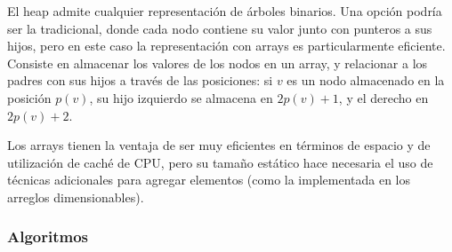 \documentclass{article}
\begin{document}
El heap admite cualquier representación de árboles binarios. Una opción podría ser la tradicional, donde cada nodo contiene su valor junto con punteros a sus hijos, pero en este caso la representación con arrays es particularmente eficiente. Consiste en almacenar los valores de los nodos en un array, y relacionar a los padres con sus hijos a través de las posiciones: si $v$ es un nodo almacenado en la posición $p(v)$, su hijo izquierdo se almacena en $2p(v) + 1$, y el derecho en $2p(v) + 2$.

Los arrays tienen la ventaja de ser muy eficientes en términos de espacio y de utilización de caché de CPU, pero su tamaño estático hace necesaria el uso de técnicas adicionales para agregar elementos (como la implementada en los arreglos dimensionables).

\subsubsection{Algoritmos}
\end{document}
